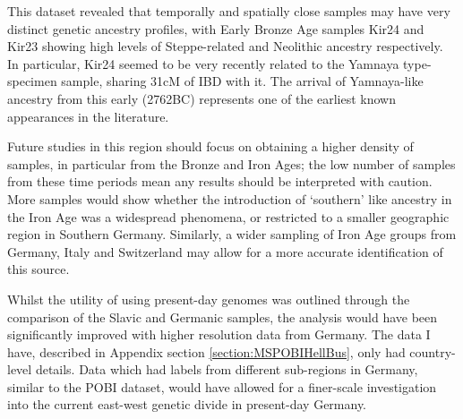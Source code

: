 This dataset revealed that temporally and spatially close samples may have very distinct genetic ancestry profiles, with Early Bronze Age samples Kir24 and Kir23 showing high levels of Steppe-related and Neolithic ancestry respectively. In particular, Kir24 seemed to be very recently related to the Yamnaya type-specimen sample, sharing 31cM of IBD with it. The arrival of Yamnaya-like ancestry from this early (2762BC) represents one of the earliest known appearances in the literature. 

Future studies in this region should focus on obtaining a higher density of samples, in particular from the Bronze and Iron Ages; the low number of samples from these time periods mean any results should be interpreted with caution. More samples would show whether the introduction of `southern' like ancestry in the Iron Age was a widespread phenomena, or restricted to a smaller geographic region in Southern Germany. Similarly, a wider sampling of Iron Age groups from Germany, Italy and Switzerland may allow for a more accurate identification of this source.

Whilst the utility of using present-day genomes was outlined through the comparison of the Slavic and Germanic samples, the analysis would have been significantly improved with higher resolution data from Germany. The data I have, described in Appendix section \ref{section:MSPOBIHellBus}, only had country-level details. Data which had labels from different sub-regions in Germany, similar to the POBI dataset, would have allowed for a finer-scale investigation into the current east-west genetic divide in present-day Germany.    

